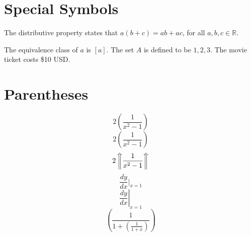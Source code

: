 \documentclass{article}
\begin{document}
\section{Special Symbols}
  The distributive property states that \(a(b+c)=ab+ac\), for all \(a, b, c \in \mathbb{R}\).
  
  The equivalence class of \(a\) is \([a]\). 
  The set \(A\) is defined to be \({1, 2, 3}\). %
  The movie ticket costs \$10 USD.
  
\section{Parentheses}
  \[2(\frac{1}{x^{2}-1})\] %
  \[2\left(\frac{1}{x^{2}-1}\right)\]
  \[2\left\Uparrow\frac{1}{x^{2}-1}\right\Uparrow\]
  \[\frac{dy}{dx}|_{x=1}\] %
  \[\left.\frac{dy}{dx}\right|_{x=1}\]
  \[\left(\frac{1}{1+\left(\frac{1}{1+x}\right)}\right)\]
  
\end{document}
